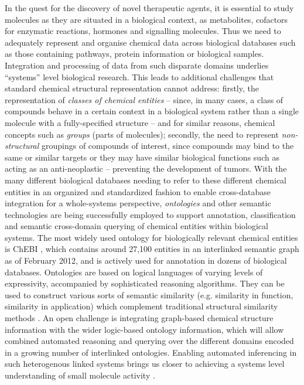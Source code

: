 \documentclass{../sig-alternate}
\begin{document}
In the quest for the discovery of novel therapeutic agents, it is
essential to study molecules as they are situated in a biological
context, as metabolites, cofactors for enzymatic reactions, hormones
and signalling molecules. Thus we need to adequately represent and
organise chemical data across biological databases such as those
containing pathways, protein information or biological
samples. Integration and processing of data from such disparate
domains underlies ``systems'' level biological research.  This leads
to additional challenges that standard chemical structural
representation cannot address: firstly, the representation of
\textit{classes of chemical entities} -- since, in many cases, a class
of compounds behave in a certain context in a biological system rather
than a single molecule with a fully-specified structure -- and for
similar reasons, chemical concepts such as \textit{groups} (parts of
molecules); secondly, the need to represent \textit{non-structural}
groupings of compounds of interest, since compounds may bind to the
same or similar targets or they may have similar biological functions
such as acting as an anti-neoplastic -- preventing the development of
tumors. With the many different biological databases needing to refer
to these different chemical entities in an organized and standardized
fashion to enable cross-database integration for a whole-systems
perspective, \textit{ontologies} and other semantic technologies are
being successfully employed to support annotation, classification and
semantic cross-domain querying of chemical entities within biological
systems. The most widely used ontology for biologically relevant
chemical entities is ChEBI \cite{chebi2010}, which contains around 27,100
entities in an interlinked semantic graph as of February 2012, and
is actively used for annotation in dozens of biological databases.
Ontologies are based on logical languages of varying levels of
expressivity, accompanied by sophisticated reasoning algorithms. They
can be used to construct various sorts of semantic similarity
(e.g. similarity in function, similarity in application) which
complement traditional structural similarity methods \cite{couto2010}.
An open challenge is integrating graph-based chemical structure
information with the wider logic-based ontology information, which
will allow combined automated reasoning and querying over the
different domains encoded in a growing number of interlinked
ontologies. 
Enabling automated inferencing in such heterogenous linked systems
brings us closer to achieving a systems level understanding of small
molecule activity \cite{Oprea:2007fk}.
\end{document}
